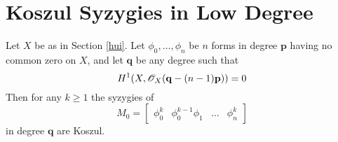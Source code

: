 \documentclass[fleqn,reqno]{amsart}
\numberwithin{first}{chapter}
\numberwithin{section}{chapter}
\numberwithin{equation}{first}
\begin{document}
\section{Koszul Syzygies in Low Degree}
\label{sec:bpf-low-koszul}

\begin{proposition}
\label{prop:koszul-syzyiges}
Let $X$ be as in Section \ref{hui}.
Let $\phi_0,\ldots,\phi_n$ be $n$ forms in degree $\mathbf p$ having no common zero on $X$,
and let $\mathbf q$ be any degree such that
\[
H^1(X,\mathscr{O}_X(\mathbf q-(n-1)\mathbf p))=0
\]
Then for any $k\geq1$ the syzygies of
\[
M_0=\begin{bmatrix}\phi_0^k& \phi_0^{k-1}\phi_1& \ldots& \phi_n^k\end{bmatrix}
\]
in degree $\mathbf q$ are Koszul.
\end{proposition}
\end{document}
